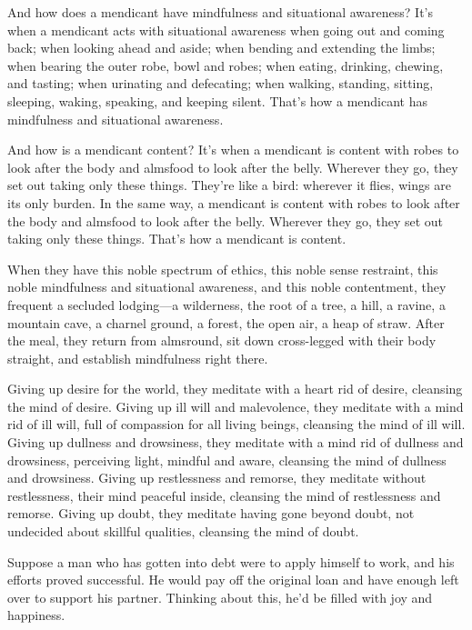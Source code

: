 \documentclass[12pt,openany]{book}%
\begin{document}
And how does a mendicant have mindfulness and situational awareness? It’s when a mendicant acts with situational awareness when going out and coming back; when looking ahead and aside; when bending and extending the limbs; when bearing the outer robe, bowl and robes; when eating, drinking, chewing, and tasting; when urinating and defecating; when walking, standing, sitting, sleeping, waking, speaking, and keeping silent. That’s how a mendicant has mindfulness and situational awareness. 

And how is a mendicant content? It’s when a mendicant is content with robes to look after the body and almsfood to look after the belly. Wherever they go, they set out taking only these things. They’re like a bird: wherever it flies, wings are its only burden. In the same way, a mendicant is content with robes to look after the body and almsfood to look after the belly. Wherever they go, they set out taking only these things. That’s how a mendicant is content. 

When they have this noble spectrum of ethics, this noble sense restraint, this noble mindfulness and situational awareness, and this noble contentment, they frequent a secluded lodging—a wilderness, the root of a tree, a hill, a ravine, a mountain cave, a charnel ground, a forest, the open air, a heap of straw. After the meal, they return from almsround, sit down cross-legged with their body straight, and establish mindfulness right there. 

Giving up desire for the world, they meditate with a heart rid of desire, cleansing the mind of desire. Giving up ill will and malevolence, they meditate with a mind rid of ill will, full of compassion for all living beings, cleansing the mind of ill will. Giving up dullness and drowsiness, they meditate with a mind rid of dullness and drowsiness, perceiving light, mindful and aware, cleansing the mind of dullness and drowsiness. Giving up restlessness and remorse, they meditate without restlessness, their mind peaceful inside, cleansing the mind of restlessness and remorse. Giving up doubt, they meditate having gone beyond doubt, not undecided about skillful qualities, cleansing the mind of doubt. 

Suppose a man who has gotten into debt were to apply himself to work, and his efforts proved successful. He would pay off the original loan and have enough left over to support his partner. Thinking about this, he’d be filled with joy and happiness. 
\end{document}
